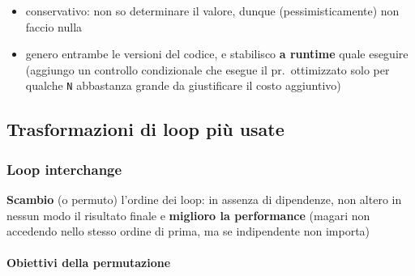 \begin{emphasize}[frametitle={Approcci per variabili di cui non conosco il valore staticamente}]
  \begin{itemize}
    \item conservativo: non so determinare il valore, dunque (pessimisticamente) non faccio nulla
    \item genero entrambe le versioni del codice, e stabilisco \textbf{a runtime} quale eseguire (aggiungo un controllo condizionale che esegue il pr.~ottimizzato solo per qualche \lstinline|N| abbastanza grande da giustificare il costo aggiuntivo)
  \end{itemize}

\end{emphasize}

\subsection{Trasformazioni di loop pi\`u usate}

\subsubsection{Loop interchange}

\textbf{Scambio} (o permuto) l'ordine dei loop: in assenza di dipendenze, non altero in nessun modo il risultato finale e \textbf{miglioro la performance} (magari non accedendo nello stesso ordine di prima, ma se indipendente non importa)

\paragraph{Obiettivi della permutazione}~\\

